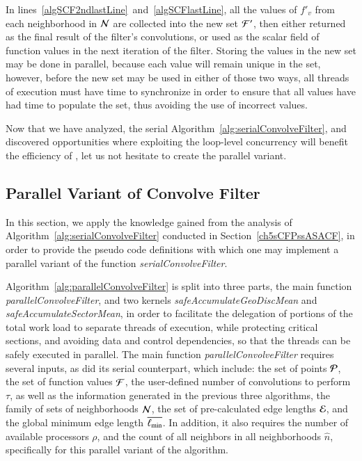 In lines~\ref{algSCF2ndlastLine}~and~\ref{algSCFlastLine}, all the values of $f'_v$ from each neighborhood in $\mathcal{N}$ are collected into the new set $\mathcal{F}'$, then either returned as the final result of the filter's convolutions, or used as the scalar field of function values in the next iteration of the filter. Storing the values in the new set may be done in parallel, because each value will remain unique in the set, however, before the new set may be used in either of those two ways, all threads of execution must have time to synchronize in order to ensure that all values have had time to populate the set, thus avoiding the use of incorrect values.

Now that we have analyzed, the serial Algorithm~\ref{alg:serialConvolveFilter}, and discovered opportunities where exploiting the loop-level concurrency will benefit the efficiency of , let us not hesitate to create the parallel variant.

%
%
\subsection{Parallel Variant of Convolve Filter}
\label{ch5sCFPssPRCN}
In this section, we apply the knowledge gained from the analysis of Algorithm~\ref{alg:serialConvolveFilter} conducted in Section~\ref{ch5sCFPssASACF}, in order to provide the pseudo code definitions with which one may implement a parallel variant of the function \textit{serialConvolveFilter}.

Algorithm~\ref{alg:parallelConvolveFilter} is split into three parts, the main function \textit{parallelConvolveFilter}, and two kernels \textit{safeAccumulateGeoDiscMean} and \textit{safeAccumulateSectorMean}, in order to facilitate the delegation of portions of the total work load to separate threads of execution, while protecting critical sections, and avoiding data and control dependencies, so that the threads can be safely executed in parallel. The main function \textit{parallelConvolveFilter} requires several inputs, as did its serial counterpart, which include: the set of points $\mathcal{P}$, the set of function values $\mathcal{F}$, the user-defined number of convolutions to perform $\tau$, as well as the information generated in the previous three algorithms, the family of sets of neighborhoods $\mathcal{N}$, the set of pre-calculated edge lengths $\mathcal{E}$, and the global minimum edge length $\overline{\ell_\text{min}}$. In addition, it also requires the number of available processors $\rho$, and the count of all neighbors in all neighborhoods $\hat{n}$, specifically for this parallel variant of the algorithm.


